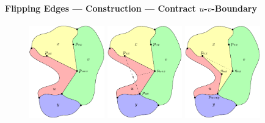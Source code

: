 \documentclass[t,18pt]{beamer}
\newcommand{\emdash}{---}
\begin{document}
\begin{frame}[c]
  \frametitle{}
  \framesubtitle{Flipping Edges \emdash{} Construction \emdash{} Contract $u$-$v$-Boundary}
  \begin{figure}
    \includegraphics[width=3.25cm]{../Thesis/Resources/FlipEdge-ContractBoundaryAbove-1.pdf}
    \quad
    \includegraphics[width=3.25cm]{../Thesis/Resources/FlipEdge-ContractBoundaryAbove-2.pdf}
    \quad
    \includegraphics[width=3.25cm]{../Thesis/Resources/FlipEdge-ContractBoundaryAbove-3.pdf}
  \end{figure}
\end{frame}
\end{document}
